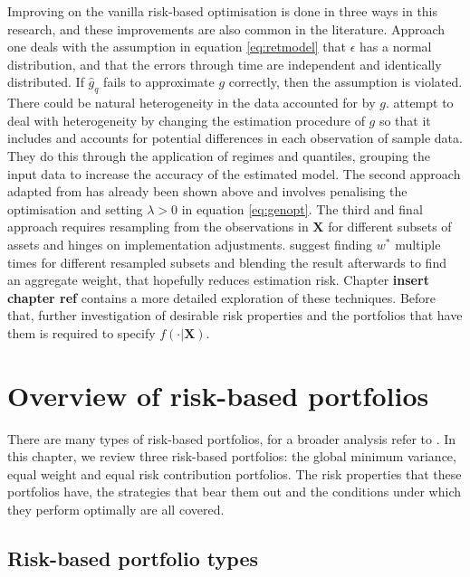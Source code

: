 \documentclass[
]{article}
\begin{document}
Improving on the vanilla risk-based optimisation is done in three ways in this research, and these
improvements are also common in the literature. Approach one deals with the assumption in equation
\eqref{eq:retmodel} that \(\epsilon\) has a normal distribution, and that the errors through time are
independent and identically distributed. If \(\hat{g}_q\) fails to approximate \(g\) correctly, then the
assumption is violated. There could be natural heterogeneity in the data accounted for by \(g\). \citet{FD18}
attempt to deal with heterogeneity by changing the estimation procedure of \({g}\) so that it includes
and accounts for potential differences in each observation of sample data. They do this through the
application of regimes and quantiles, grouping the input data to increase the accuracy of the
estimated model. The second approach adapted from \citet{K18} has already been shown above and
involves penalising the optimisation and setting \(\lambda > 0\) in equation \eqref{eq:genopt}. The
third and final approach requires resampling from the observations in \(\textbf{X}\) for different
subsets of assets and hinges on implementation adjustments. \citet{SW17} suggest finding \(w^*\)
multiple times for different resampled subsets and blending the result afterwards to find an
aggregate weight, that hopefully reduces estimation risk. Chapter \textbf{insert chapter ref} contains a
more detailed exploration of these techniques. Before that, further investigation of desirable risk
properties and the portfolios that have them is required to specify \(f(\cdot|\textbf{X})\).

\hypertarget{rbportch}{%
\section{Overview of risk-based portfolios}\label{rbportch}}

There are many types of risk-based portfolios, for a broader analysis refer to \citet{DV17}. In this chapter,
we review three risk-based portfolios: the global minimum variance, equal weight and equal risk
contribution portfolios. The risk properties that these portfolios have, the strategies that bear them
out and the conditions under which they perform optimally are all covered.

\hypertarget{risk-based-portfolio-types}{%
\subsection{Risk-based portfolio types}\label{risk-based-portfolio-types}}
\end{document}
